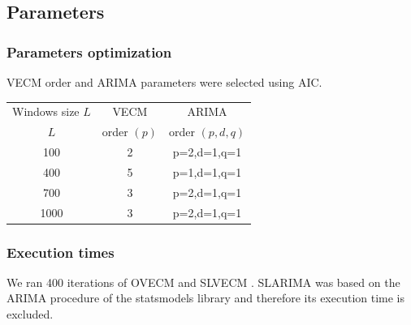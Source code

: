 \documentclass{beamer}
\begin{document}
\subsection{Parameters}
\begin{frame}
\frametitle{Parameters optimization}
VECM order and ARIMA parameters were selected using AIC.
\begin{table}[ht]
\label{tab:params}
\begin{center}
\begin{tabular}{|c|c|c|}
\hline
Windows size $L$ & VECM & ARIMA\\
 $L$ & order $(p)$ & order $(p,d,q)$ \\
\hline
100 & 2 & p=2,d=1,q=1\\
400 & 5 & p=1,d=1,q=1\\
700 & 3 &p=2,d=1,q=1\\
1000 &3 & p=2,d=1,q=1\\
\hline
\end{tabular}
\end{center}
\end{table}
\end{frame}

\begin{frame}
\frametitle{Execution times}
We ran 400 iterations of OVECM and SLVECM . SLARIMA was based on the ARIMA procedure
of the statsmodels library and therefore its execution time is excluded.
\begin{center}
\end{center}
\end{frame}
\end{document}
